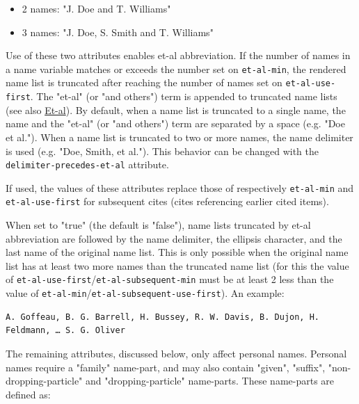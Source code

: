 \begin{description}
\begin{itemize}
  \begin{itemize}
  \tightlist
  \item
    2 names: "J. Doe and T. Williams"
  \item
    3 names: "J. Doe, S. Smith and T. Williams"
  \end{itemize}
\end{itemize}
\item[\texttt{et-al-min} / \texttt{et-al-use-first}]
Use of these two attributes enables et-al abbreviation. If the number of
names in a name variable matches or exceeds the number set on
\texttt{et-al-min}, the rendered name list is truncated after reaching
the number of names set on \texttt{et-al-use-first}. The "et-al" (or
"and others") term is appended to truncated name lists (see also
\protect\hyperlink{et-al}{Et-al}). By default, when a name list is
truncated to a single name, the name and the "et-al" (or "and others")
term are separated by a space (e.g. "Doe et al."). When a name list is
truncated to two or more names, the name delimiter is used (e.g. "Doe,
Smith, et al."). This behavior can be changed with the
\texttt{delimiter-precedes-et-al} attribute.
\item[\texttt{et-al-subsequent-min} /
\texttt{et-al-subsequent-use-first}]
If used, the values of these attributes replace those of respectively
\texttt{et-al-min} and \texttt{et-al-use-first} for subsequent cites
(cites referencing earlier cited items).
\item[\texttt{et-al-use-last}]
When set to "true" (the default is "false"), name lists truncated by
et-al abbreviation are followed by the name delimiter, the ellipsis
character, and the last name of the original name list. This is only
possible when the original name list has at least two more names than
the truncated name list (for this the value of
\texttt{et-al-use-first}/\texttt{et-al-subsequent-min} must be at least
2 less than the value of
\texttt{et-al-min}/\texttt{et-al-subsequent-use-first}). An example:

\begin{verbatim}
A. Goffeau, B. G. Barrell, H. Bussey, R. W. Davis, B. Dujon, H.
Feldmann, … S. G. Oliver
\end{verbatim}
\end{description}

The remaining attributes, discussed below, only affect personal names.
Personal names require a "family" name-part, and may also contain
"given", "suffix", "non-dropping-particle" and "dropping-particle"
name-parts. These name-parts are defined as:

